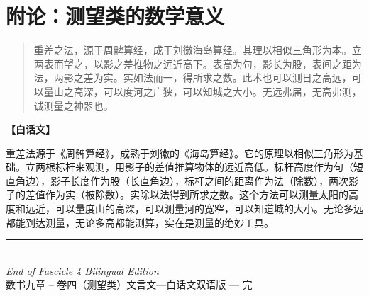 \documentclass[11pt,a4paper]{article}
\begin{document}
\vspace{1cm}

\section*{附论：测望类的数学意义}

\begin{originaltext}
\begin{quote}
\textcolor{origcolor}{%
重差之法，源于周髀算经，成于刘徽海岛算经。其理以相似三角形为本。立两表而望之，以影之差推物之远近高下。表高为句，影长为股，表间之距为法，两影之差为实。实如法而一，得所求之数。此术也可以测日之高远，可以量山之高深，可以度河之广狭，可以知城之大小。无远弗届，无高弗测，诚测量之神器也。
}
\end{quote}
\end{originaltext}

\begin{moderntext}
\textbf{【白话文】}

重差法源于《周髀算经》，成熟于刘徽的《海岛算经》。它的原理以相似三角形为基础。立两根标杆来观测，用影子的差值推算物体的远近高低。标杆高度作为句（短直角边），影子长度作为股（长直角边），标杆之间的距离作为法（除数），两次影子的差值作为实（被除数）。实除以法得到所求之数。这个方法可以测量太阳的高度和远近，可以量度山的高深，可以测量河的宽窄，可以知道城的大小。无论多远都能到达测量，无论多高都能测算，实在是测量的绝妙工具。
\end{moderntext}

\vspace{1cm}

\begin{center}
{\color{rulecolor}\rule{8cm}{0.4pt}}\\[0.5cm]
{\small\textit{End of Fascicle 4 Bilingual Edition}}\\[0.3cm]
{\small 数书九章 -- 卷四（测望类）文言文—白话文双语版 — 完}
\end{center}
\end{document}
